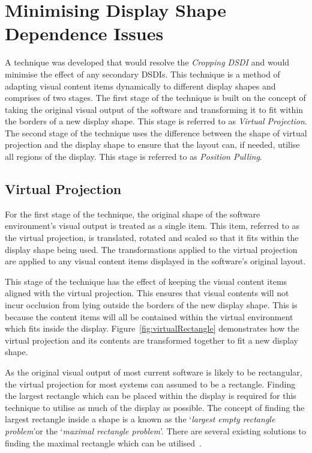 \documentclass{bmcart}
\begin{document}
\section*{Minimising Display Shape Dependence Issues}
\label{sec:solution}

A technique was developed that would resolve the {\emph{Cropping \ac{DSDI}}} and would minimise the effect of any secondary \acp{DSDI}.
This technique is a method of adapting visual content items dynamically to different display shapes and comprises of two stages.
The first stage of the technique is built on the concept of taking the original visual output of the software and transforming it to fit within the borders of a new display shape.
This stage is referred to as {\em Virtual Projection}.
The second stage of the technique uses the difference between the shape of virtual projection and the display shape to ensure that the layout can, if needed, utilise all regions of the display.
This stage is referred to as {\em Position Pulling}.

\subsection*{Virtual Projection}
\label{subsec:virtualprojection}


For the first stage of the technique, the original shape of the software environment's visual output is treated as a single item.
This item, referred to as the virtual projection, is translated, rotated and scaled so that it fits within the display shape being used.
The transformations applied to the virtual projection are applied to any visual content items displayed in the software's original layout.

This stage of the technique has the effect of keeping the visual content items aligned with the virtual projection.
This ensures that visual contents will not incur occlusion from lying outside the borders of the new display shape.
This is because the content items will all be contained within the virtual environment which fits inside the display.
Figure~\ref{fig:virtualRectangle} demonstrates how the virtual projection and its contents are transformed together to fit a new display shape.

As the original visual output of most current software is likely to be rectangular, the virtual projection for most systems can assumed to be a rectangle.
Finding the largest rectangle which can be placed within the display is required for this technique to utilise as much of the display as possible.
The concept of finding the largest rectangle inside a shape is a known as the \lq {\emph{largest empty rectangle problem}}\rq or the \lq {\emph{maximal rectangle problem}}\rq .
There are several existing solutions to finding the maximal rectangle which can be utilised~\cite{Aggarwal1987,Naamad1984}.
\end{document}
